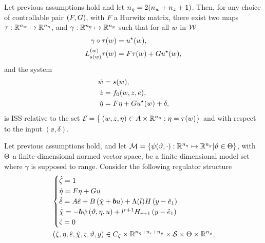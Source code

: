 \begin{lemma}%
   \label{LEMMA:LUMBERGER-INTERNAL-MODEL}
   Let previous assumptions hold and let $n_{\eta} = 2(n_{w}+n_{z}+1)$.
   Then, for any choice of controllable pair $\left( F, G \right)$, with $F$ a Hurwitz matrix, there exist
   two maps $\tau: \mathbb{R}^{n_{w}} \mapsto \mathbb{R}^{n_{\eta}}$, and $\gamma: \mathbb{R}^{n_{\eta}} \mapsto \mathbb{R}^{n_{y}}$ such that
   for all $w$ in $\mathcal{W}$
   \begin{equation*}
      \begin{split}
      \gamma \circ \tau(w) &= u^{\star}(w), \\
      L_{s(w)}^{(w)} \tau(w) &= F \tau(w) + G u^{\star}(w),
      \end{split}
   \end{equation*}
   and the system
   \begin{equation*}
      \begin{split}
         \dot{w} & = s(w), \\
         \dot{z} & = f_0(w,z,e), \\
         \dot{\eta} & = F \eta + G u^{\star}(w) + \delta,
      \end{split}
   \end{equation*}
   is ISS relative to the set $\mathcal{E} = \big\{ \left( w, z, \eta \right) \in A \times \mathbb{R}^{n_{\eta}}: \eta = \tau(w) \big\}$
   and with respect to the input $(\ee, \delta)$. 
\end{lemma}
Let previous assumptions hold, and let $\mathcal{M} = \left\{ \psi(\vartheta, \cdot): \mathbb{R}^{n_{\eta}} \mapsto \mathbb{R}^{n_{y}} | \vartheta \in \Theta \right\}$,
with $\Theta$ a finite-dimensional normed vector space, be a finite-dimensional model set where $\gamma$ is supposed to range.
Consider the following regulator structure 
\begin{equation*}
   \begin{split}
      &
      \begin{cases}
         \dot{\zeta} = 1 \\
         \dot{\eta} = F \eta + G u \\
         \dot{\hat{e}} = A \hat{e} + B \left( \hat{\chi} + \boldsymbol{b} u \right) + \Lambda(l) H \left( y - \hat{e}_1 \right) \\
         \dot{\hat{\chi}} = - \boldsymbol{b} \psi \left( \vartheta, \eta, u \right) + l^{r+1} H_{r+1} \left( y - \hat{e}_1 \right)\\
         \dot{\varsigma} = 0
      \end{cases} \\
      & \left( \zeta, \eta, \hat{e}, \hat{\chi}, \varsigma, \vartheta, y \right) \in C_{\zeta} \times \mathbb{R}^{n_{\eta} + n_{e} + n_{y}} \times \mathcal{S} \times \Theta \times \mathbb{R}^{n_{y}},
   \end{split}
\end{equation*}
